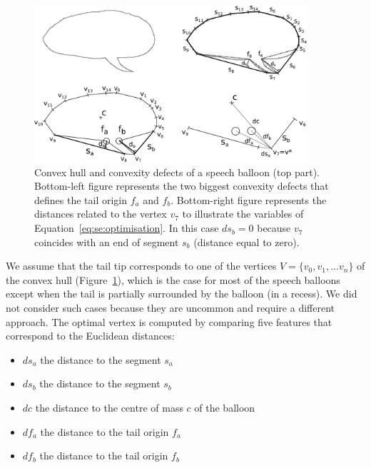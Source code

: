     \begin{figure}[ht]%
      \centering
      \includegraphics[width=0.9\textwidth]{tail_description.pdf}
    \caption[Convex hull and convexity defects of a speech balloon]{Convex hull and convexity defects of a speech balloon (top part). Bottom-left figure represents the two biggest convexity defects that defines the tail origin $f_a$ and $f_b$. Bottom-right figure represents the distances related to the vertex $v_7$ to illustrate the variables of Equation~\ref{eq:se:optimisation}. In this case $ds_b=0$ because $v_7$ coincides with an end of segment $s_b$ (distance equal to zero).}
    \label{fig:se:convexity_defects}
    \end{figure}

We assume that the tail tip corresponds to one of the vertices $V=\{v_0,v_1,...v_n\}$ of the convex hull (Figure~\ref{fig:se:convexity_defects}), which is the case for most of the speech balloons except when the tail is partially surrounded by the balloon (in a recess).
We did not consider such cases because they are uncommon and require a different approach.
The optimal vertex is computed by comparing five features that correspond to the Euclidean distances:

\begin{itemize}
   \item $ds_a$ the distance to the segment $s_a$
   \item $ds_b$ the distance to the segment $s_b$
   \item $dc$ the distance to the centre of mass $c$ of the balloon
   \item $df_a$ the distance to the tail origin $f_a$
   \item $df_b$ the distance to the tail origin $f_b$
 \end{itemize}

